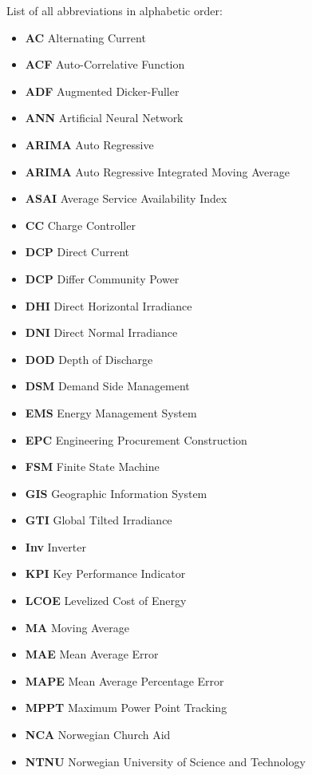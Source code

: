 
List of all abbreviations in alphabetic order:

\begin{itemize}
    \item \textbf{AC} Alternating Current
    \item \textbf{ACF} Auto-Correlative Function
    \item \textbf{ADF} Augmented Dicker-Fuller
    \item \textbf{ANN} Artificial Neural Network
    \item \textbf{ARIMA} Auto Regressive
    \item \textbf{ARIMA} Auto Regressive Integrated Moving Average
    \item \textbf{ASAI} Average Service Availability Index 
    \item \textbf{CC} Charge Controller
    \item \textbf{DCP} Direct Current
    \item \textbf{DCP} Differ Community Power
    \item \textbf{DHI} Direct Horizontal Irradiance
    \item \textbf{DNI} Direct Normal Irradiance
    \item \textbf{DOD} Depth of Discharge
    \item \textbf{DSM} Demand Side Management
    \item \textbf{EMS} Energy Management System
    \item \textbf{EPC} Engineering Procurement Construction
    \item \textbf{FSM} Finite State Machine
    \item \textbf{GIS} Geographic Information System
    \item \textbf{GTI} Global Tilted Irradiance
    \item \textbf{Inv} Inverter
    \item \textbf{KPI} Key Performance Indicator
    \item \textbf{LCOE} Levelized Cost of Energy
    \item \textbf{MA} Moving Average
    \item \textbf{MAE} Mean Average Error
    \item \textbf{MAPE} Mean Average Percentage Error
    \item \textbf{MPPT} Maximum Power Point Tracking
    \item \textbf{NCA} Norwegian Church Aid
    \item \textbf{NTNU} Norwegian University of Science and Technology

\end{itemize}
